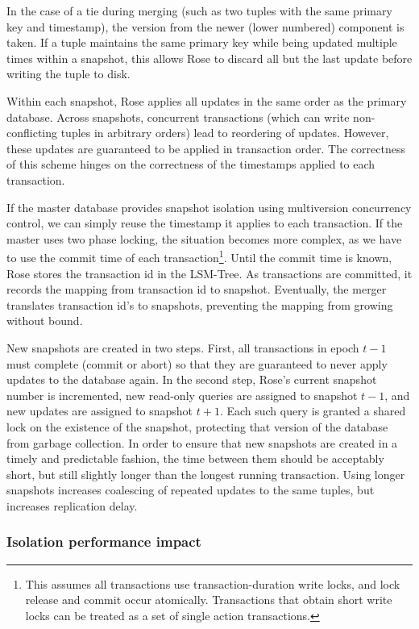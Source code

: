 \documentclass{vldb}
\newcommand{\rows}{Rose\xspace}
\newcommand{\rowss}{Rose's\xspace}
\begin{document}
In the case of a tie
during merging (such as two tuples with the same primary key and
timestamp), the version from the newer (lower numbered) component is
taken.  If a tuple maintains the same primary key while being updated
multiple times within a snapshot, this allows \rows to discard all but
the last update before writing the tuple to disk.

Within each snapshot, \rows applies all updates in the
same order as the primary database.  Across snapshots, concurrent
transactions (which can write non-conflicting tuples in arbitrary
orders) lead to reordering of updates.  However, these updates are
guaranteed to be applied in transaction order.  The correctness of
this scheme hinges on the correctness of the timestamps applied to
each transaction.

If the master database provides snapshot isolation using multiversion
concurrency control, we can
simply reuse the timestamp it applies to each transaction.  If the
master uses two phase locking, the situation becomes more complex, as
we have to use the commit time of each transaction\footnote{This assumes
  all transactions use transaction-duration write locks, and lock
  release and commit occur atomically.  Transactions that obtain short
  write locks can be treated as a set of single action transactions.}.
Until the commit time is known, \rows stores the transaction id in the
LSM-Tree.  As transactions are committed, it records the mapping from
transaction id to snapshot.  Eventually, the merger translates
transaction id's to snapshots, preventing the mapping from growing
without bound.

New snapshots are created in two steps.  First, all transactions in
epoch $t-1$ must complete (commit or abort) so that they are
guaranteed to never apply updates to the database again.  In the
second step, \rowss current snapshot number is incremented, new
read-only queries are assigned to snapshot $t-1$, and new updates
are assigned to snapshot $t+1$.  Each such query is granted a
shared lock on the existence of the snapshot, protecting that version
of the database from garbage collection.  In order to ensure that new
snapshots are created in a timely and predictable fashion, the time
between them should be acceptably short, but still slightly longer
than the longest running transaction.  Using longer snapshots
increases coalescing of repeated updates to the same tuples,
but increases replication delay.

\subsubsection{Isolation performance impact}
\end{document}
